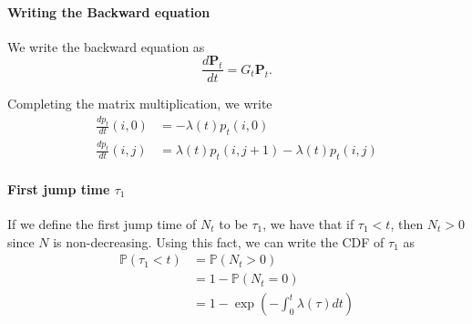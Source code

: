 \documentclass[12pt]{article}
\newcommand{\Prob}{\mathbb{P}}
\let\vec\mathbf
\theoremstyle{definition}
\theoremstyle{remark}
\begin{document}
\paragraph{Writing the Backward equation}%
\label{par:writing_the_backward_equation}
We write the backward equation as
\begin{equation*}
\frac{d \vec{P}_{t}}{dt} = G_{t}\vec{P}_{t}.
\end{equation*}

Completing the matrix multiplication, we write
\begin{align*}
    \frac{dp_{t}}{dt}(i, 0) &=   - \lambda(t) p_{t}(i,0)\\
    \frac{dp_{t}}{dt}(i, j) &=  \lambda(t) p_{t}(i,j+1) - \lambda(t) p_{t}(i,j)
\end{align*}
\paragraph{First jump time $\tau_{1}$}%
\label{par:first_jump_time_1_}

If we define the first jump time of $N_{t}$ to be $\tau_{1}$, we have that if $\tau_{1} < t$, then $N_{t} > 0$ since $N$ is non-decreasing. Using this fact, we can write the CDF of $\tau_{1}$ as
\begin{align*}
    \Prob(  \tau_{1} < t) &= \Prob( N_{t} > 0 )\\\
                          &= 1 - \Prob(N_{t} = 0)\\
                          &= 1 - \exp\left( - \int_{0}^{t} \lambda(\tau)dt \right)
\end{align*}
\end{document}
